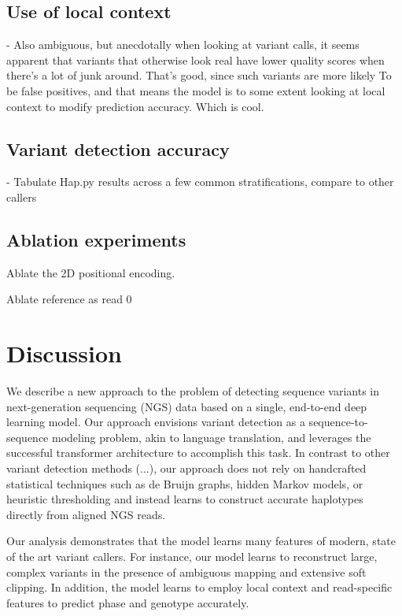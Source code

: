 \documentclass[]{article}
\begin{document}
\subsection{Use of local context}
 - Also ambiguous, but anecdotally when looking at variant calls, it seems apparent that variants that otherwise look real have lower quality scores when there's a lot of junk around. That's good, since such variants are more likely To
 be false positives, and that means the model is to some extent looking at local context to modify prediction accuracy. Which is cool. 



 \subsection{Variant detection accuracy}

 - Tabulate Hap.py results across a few common stratifications, compare to other callers

\subsection{Ablation experiments}
 
 Ablate the 2D positional encoding.

 Ablate reference as read 0 
 
 


\section{Discussion}

We describe a new approach to the problem of detecting sequence variants in next-generation sequencing (NGS) data based on a single, end-to-end deep learning model. Our approach envisions variant detection as a sequence-to-sequence modeling problem, akin to language translation, and leverages the successful transformer architecture to accomplish this task. In contrast to other variant detection methods (...), our approach does not rely on handcrafted statistical techniques such as de Bruijn graphs, hidden Markov models, or heuristic thresholding and instead learns to construct accurate haplotypes directly from aligned NGS reads. 
 
Our analysis demonstrates that the model learns many features of modern, state of the art variant callers. For instance, our model learns to reconstruct large, complex variants in the presence of ambiguous mapping and extensive soft clipping. In addition, the model learns to employ local context and read-specific features to predict phase and genotype accurately.  
\end{document}
